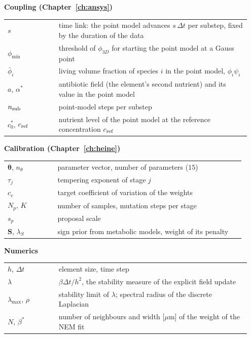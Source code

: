 \documentclass[12pt, a4paper, twoside]{report}
\newcommand{\btheta}{\boldsymbol{\theta}}
\begin{document}
\medskip\noindent\textbf{Coupling (Chapter~\ref{ch:ansys})}\\[2pt]
\begin{tabular}{@{}p{0.2\linewidth}p{0.75\linewidth}@{}}
$s$ & time link: the point model advances $s\,\Delta t$ per substep, fixed by the duration of the data\\
$\phi_{\min}$ & threshold of $\phi_{3D}$ for starting the point model at a Gauss point\\
$\bar\phi_i$ & living volume fraction of species $i$ in the point model, $\phi_i\psi_i$\\
$a$, $\alpha^*$ & antibiotic field (the element's second nutrient) and its value in the point model\\
$n_{\rm sub}$ & point-model steps per substep\\
$c^*_0$, $c_{\rm ref}$ & nutrient level of the point model at the reference concentration $c_{\rm ref}$\\
\end{tabular}

\medskip\noindent\textbf{Calibration (Chapter~\ref{ch:heine})}\\[2pt]
\begin{tabular}{@{}p{0.2\linewidth}p{0.75\linewidth}@{}}
$\btheta$, $n_\theta$ & parameter vector, number of parameters ($15$)\\
$\tau_j$ & tempering exponent of stage $j$\\
$c_v$ & target coefficient of variation of the weights\\
$N_p$, $K$ & number of samples, mutation steps per stage\\
$s_p$ & proposal scale\\
$\mathbf S$, $\lambda_S$ & sign prior from metabolic models, weight of its penalty\\
\end{tabular}

\medskip\noindent\textbf{Numerics}\\[2pt]
\begin{tabular}{@{}p{0.2\linewidth}p{0.75\linewidth}@{}}
$h$, $\Delta t$ & element size, time step\\
$\lambda$ & $\beta\Delta t/h^2$, the stability measure of the explicit field update\\
$\lambda_{\max}$, $\rho$ & stability limit of $\lambda$; spectral radius of the discrete Laplacian\\
$N$, $\beta^*$ & number of neighbours and width [$\mu$m] of the weight of the NEM fit\\
\end{tabular}
\end{document}
